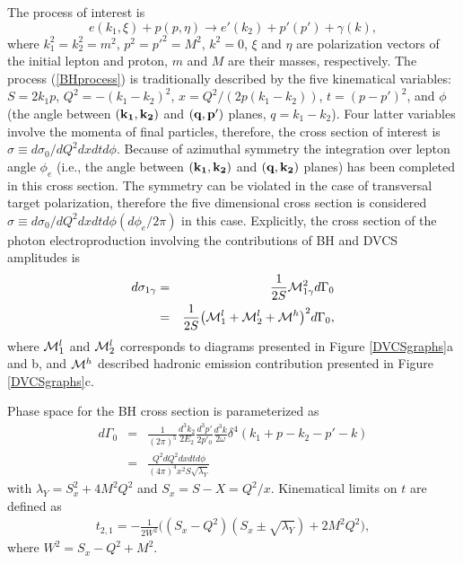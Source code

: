 \documentclass[aps,prd,reprint,groupedaddress,preprintnumbers,showpacs]{revtex4-1}
\begin{document}
The process of interest is 
\begin{equation}\label{BHprocess}
e(k_1,\xi)+p(p,\eta)\longrightarrow e'(k_2)+p'(p')+\gamma(k),
\end{equation}
where $k_1^2=k_2^2=m^2$, $p^2=p'^2=M^2$, $k^2=0$, $\xi$ and $\eta$ are polarization vectors of the initial lepton and proton, 
$m$ and $M$ are their masses, respectively.  
The process (\ref{BHprocess}) 
is traditionally described 
by the 
five kinematical variables: 
$S=2k_1p$, $Q^2=-(k_1-k_2)^2$, $x=Q^2/(2p(k_1-k_2))$, $t=(p-p')^2$, and $\phi$ (the angle between 
$({\bf k_1},{\bf k_2})$ and $({\bf q},{\bf p'})$  planes, $q=k_1-k_2$). Four latter variables involve the momenta of final particles, therefore, the cross section of interest is $\sigma\equiv d\sigma_0/dQ^2dxdtd\phi$. Because of azimuthal symmetry the integration over lepton angle $\phi_e$ (i.e., the angle between 
$({\bf k_1},{\bf k_2})$ and $({\bf q},{\bf k_2})$  planes) has been completed in this cross section. The symmetry can be violated in the case of transversal target polarization, therefore the five dimensional cross section is considered $\sigma\equiv d\sigma_0/dQ^2dxdtd\phi(d\phi_e/2\pi)$ in this case. Explicitly, 
the cross section of the photon electroproduction involving the contributions of BH and DVCS amplitudes is  
\begin{eqnarray}\label{dGamma}
d\sigma_{1\gamma}&=&\frac 1{2S} {\cal M}_{1\gamma}^2 d\Gamma_0
\nonumber\\
&=&\frac 1{2S} \bigl({\cal M}_1^l+{\cal M}_2^l+{\cal M}^h\bigr)^2 d\Gamma_0,
\end{eqnarray}
where ${\cal M}_1^l$ and ${\cal M}_2^l$ corresponds to diagrams presented in Figure \ref{DVCSgraphs}a and b, and  ${\cal M}^h$ described hadronic emission contribution presented in Figure \ref{DVCSgraphs}c.

 Phase space for the BH cross section is parameterized as 
\begin{eqnarray}
d\Gamma_0&=&\frac 1{(2\pi)^5}
\frac{d^3k_2}{2E_2}
\frac{d^3p'}{2p'_0}
\frac{d^3k}{2\omega}
\delta^4(k_1+p-k_2-p'-k)
\nonumber \\&=&
\frac{Q^2dQ^2dxdtd\phi}{(4\pi)^4x^2 S \sqrt{\lambda _Y}}
\end{eqnarray}
with $\lambda _Y=S_x^2+4 M^2Q^2$ and $S_x=S-X=Q^2/x$. Kinematical limits on $t$ are defined as
\begin{eqnarray}
t_{2,1}=-\frac{1}{2W^2}\bigl((S_x-Q^2)(S_x\pm\sqrt{\lambda_Y})+2M^2Q^2\bigr),
\end{eqnarray}
where $W^2=S_x-Q^2+M^2$.
\end{document}
